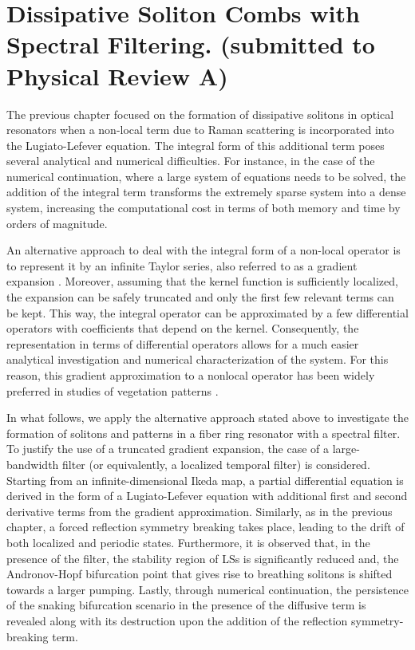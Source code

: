 \chapter{Dissipative Soliton Combs with Spectral Filtering. (submitted to Physical Review A)}

\label{ch:filtering}

The previous chapter focused on the formation of dissipative solitons in optical
resonators when a non-local term due to Raman scattering is incorporated into the Lugiato-Lefever equation. The
integral form of this additional term poses several analytical and numerical difficulties.
For instance, in the case of the numerical continuation, where a
large system of equations needs to be solved, the addition of the integral term transforms the extremely sparse
system into a dense system, increasing the computational cost in terms of both memory and time
by orders of magnitude.

An alternative approach to deal with the integral form of a non-local operator is to represent
it by an infinite Taylor series, also referred to as a gradient expansion \cite{murray2003mathematical}. Moreover, 
assuming that the kernel function is sufficiently localized, the expansion can be
safely truncated and only the first few relevant terms can be kept. This way, the integral operator can be
approximated by a few differential operators with coefficients that depend on
the kernel. Consequently, the representation in terms of differential operators
allows for a much easier analytical investigation and numerical characterization of the system.
For this reason, this gradient approximation to a nonlocal operator has been widely 
preferred in studies of vegetation patterns \cite{lefever1997origin,clerc2021localised,pinto2022vegetation,pinto2023topological}.

In what follows, we apply the alternative approach stated above to investigate
the formation of solitons and patterns in a fiber ring resonator with a spectral filter.
To justify the use of a truncated gradient expansion, the case of a large-bandwidth filter
(or equivalently, a localized temporal filter) is considered. Starting from an infinite-dimensional
Ikeda map, a partial differential equation is derived in the form of a Lugiato-Lefever equation with additional
first and second derivative terms from the gradient approximation. Similarly, as in the previous chapter,
a forced reflection symmetry breaking takes place, leading to the drift of both localized and periodic states.
Furthermore, it is observed that, in the presence of the filter, the stability region of LSs is significantly reduced
and, the Andronov-Hopf bifurcation point that gives rise to breathing solitons is shifted towards a larger pumping.
Lastly, through numerical continuation, the persistence of the snaking bifurcation scenario in
the presence of the diffusive term is revealed along with its destruction upon the addition of the reflection symmetry-breaking term.

